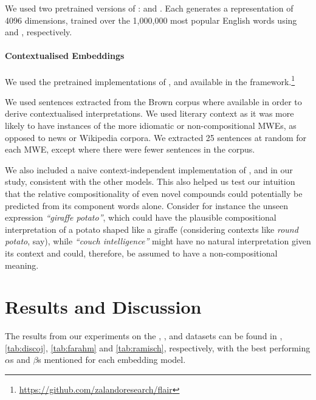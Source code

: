 We used two pretrained versions of \infersent: \infersent[\glove] and \infersent[\fasttext]. Each generates a representation of 4096 dimensions, trained over the 1,000,000 most popular English words using \glove \citep{Jeffrey2014} and \fasttext, respectively.

\paragraph{Contextualised Embeddings}
We used the pretrained implementations of \elmo, \bert and \flair available in the \flair framework.\footnote{\url{https://github.com/zalandoresearch/flair}}

We used sentences extracted from the Brown corpus where available in order to derive contextualised interpretations. We used literary context as it was more likely to have instances of the more idiomatic or non-compositional MWEs, as opposed to news or Wikipedia corpora. We extracted 25 sentences at random for each MWE, except where there were fewer sentences in the corpus.

We also included a naive context-independent implementation of \elmo, \bert and \flair in our study, consistent with the other models. This also helped us test our intuition that the relative compositionality of even novel compounds could potentially be predicted from its component words alone. Consider for instance the unseen expression \textit{``giraffe potato''}, which could have the plausible compositional interpretation of a potato shaped like a giraffe (considering contexts like \textit{round potato}, say), while \textit{``couch intelligence''} might have no natural interpretation given its context and could, therefore, be assumed to have a non-compositional meaning.

\section{Results and Discussion}
\label{sec:results}
The results from our experiments on the \reddy,  \discoj, \farahm and \ramisch datasets can be found in ,\ref{tab:discoj}, \ref{tab:farahm} and \ref{tab:ramisch}, respectively, with the best performing $\alpha$s and $\beta$s mentioned for each embedding model.

